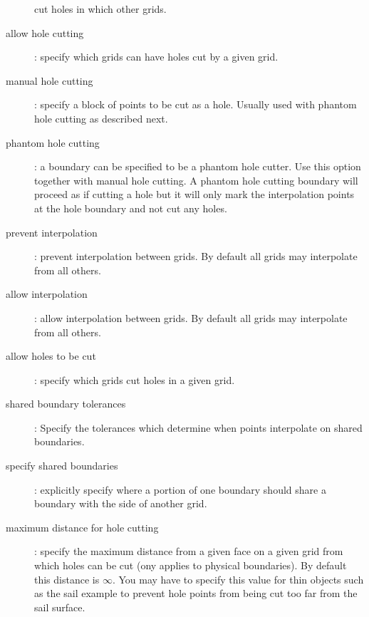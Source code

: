 \begin{description}
      cut holes in which other grids. 
  \item[allow hole cutting] : specify which grids can have holes cut by a given grid.
  \item[manual hole cutting] : specify a block of points to be cut as a hole. Usually used with
      phantom hole cutting as described next.
  \item[phantom hole cutting] : a boundary can be specified to be a phantom hole cutter. Use this 
    option together with manual hole cutting. A phantom hole cutting boundary will proceed as if cutting
    a hole but it will only mark the interpolation points at the hole boundary and not cut any holes.
  \item[prevent interpolation] : prevent interpolation between grids. By default all grids may interpolate
      from all others. 
  \item[allow interpolation] : allow interpolation between grids.  By default all grids may interpolate
      from all others. 
  \item[allow holes to be cut]: specify which grids cut holes in a given grid.
  \item[shared boundary tolerances] : Specify the tolerances which determine when points interpolate
    on shared boundaries. 
  \item[specify shared boundaries] : explicitly specify where a portion of one boundary should
       share a boundary with the side of another grid.
  \item[maximum distance for hole cutting]: specify the maximum distance from a given face on a given
         grid  from which holes can be cut (ony applies to physical boundaries). By default this
       distance is $\infty$. You may have to specify this value for thin objects such as the sail
       example to prevent hole points from being cut too far from the sail surface.

\end{description}
